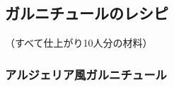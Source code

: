 \hypertarget{garnitures-recettes}{%
\subsection{ガルニチュールのレシピ}\label{garnitures-recettes}}


\begin{center}
（すべて仕上がり10人分の材料）
\end{center}
\begin{recette}
\hypertarget{ux30a2ux30ebux30b8ux30a7ux30eaux30a2ux98a8ux30acux30ebux30cbux30c1ux30e5ux30fcux30eb}{%
\subsubsection{アルジェリア風ガルニチュール}\label{ux30a2ux30ebux30b8ux30a7ux30eaux30a2ux98a8ux30acux30ebux30cbux30c1ux30e5ux30fcux30eb}}

\end{recette}